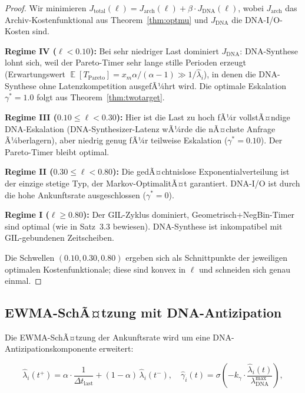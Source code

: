﻿\documentclass[a4paper,12pt]{article}
\theoremstyle{definition}
\DeclareMathOperator{\E}{\mathbb{E}}
\newcommand{\Pareto}{\mathrm{Pareto}}
\begin{document}
\begin{proof}
  Wir minimieren $J_{\mathrm{total}}(\ell) = J_{\mathrm{arch}}(\ell)
  + \beta \cdot J_{\mathrm{DNA}}(\ell)$, wobei
  $J_{\mathrm{arch}}$ das Archiv-Kosten\-funktional aus Theorem~\ref{thm:optmu}
  und $J_{\mathrm{DNA}}$ die DNA-I/O-Kosten sind.

  \textbf{Regime IV ($\ell < 0.10$):} Bei sehr niedriger Last
  dominiert $J_{\mathrm{DNA}}$: DNA-Synthese lohnt sich, weil der
  Pareto-Timer sehr lange stille Perioden erzeugt (Erwartungswert
  $\E[T_\Pareto] = x_m \alpha /(\alpha - 1) \gg 1/\hat\lambda_i$),
  in denen die DNA-Synthese ohne Latenzkompetition ausgefÃ¼hrt wird.
  Die optimale Eskalation $\gamma^* = 1.0$ folgt aus Theorem~\ref{thm:twotarget}.

  \textbf{Regime III ($0.10 \le \ell < 0.30$):} Hier ist die Last zu hoch
  fÃ¼r vollstÃ¤ndige DNA-Eskalation (DNA-Synthesizer-Latenz wÃ¼rde die
  nÃ¤chste Anfrage Ã¼berlagern), aber niedrig genug fÃ¼r teilweise Eskalation
  ($\gamma^* = 0.10$). Der Pareto-Timer bleibt optimal.

  \textbf{Regime II ($0.30 \le \ell < 0.80$):} Die gedÃ¤chtnislose
  Exponentialverteilung ist der einzige stetige Typ, der Markov-OptimalitÃ¤t
  garantiert. DNA-I/O ist durch die hohe Ankunftsrate ausgeschlossen
  ($\gamma^* = 0$).

  \textbf{Regime I ($\ell \ge 0.80$):} Der GIL-Zyklus dominiert,
  Geometrisch+NegBin-Timer sind optimal (wie in \cite{epp2026pymca8}
  Satz~3.3 bewiesen). DNA-Synthese ist inkompatibel mit GIL-gebundenen
  Zeitscheiben.

  Die Schwellen $(0.10, 0.30, 0.80)$ ergeben sich als Schnittpunkte
  der jeweiligen optimalen Kostenfunktionale; diese sind konvex in $\ell$
  und schneiden sich genau einmal.
\end{proof}

\subsection{EWMA-SchÃ¤tzung mit DNA-Antizipation}

Die EWMA-SchÃ¤tzung der Ankunftsrate wird um eine DNA-Antizipationskomponente
erweitert:

\begin{equation}
  \hat\lambda_i(t^+) = \alpha \cdot \frac{1}{\Delta t_{\mathrm{last}}}
  + (1-\alpha)\,\hat\lambda_i(t^-),
  \quad
  \hat\gamma_i(t) = \sigma\!\left(-k_\gamma \cdot
  \frac{\hat\lambda_i(t)}{\lambda_{\mathrm{DNA}}^{\mathrm{max}}}\right),
  \label{eq:ewma_dna}
\end{equation}
\end{document}
